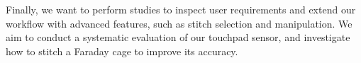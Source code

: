 \documentclass[header.tex]{subfiles}
\begin{document}
Finally, we want to perform studies to inspect user requirements and extend our workflow with advanced features, such as stitch selection and manipulation. We aim to conduct a systematic evaluation of our touchpad sensor, and investigate how to stitch a Faraday cage to improve its accuracy. %












\end{document}
